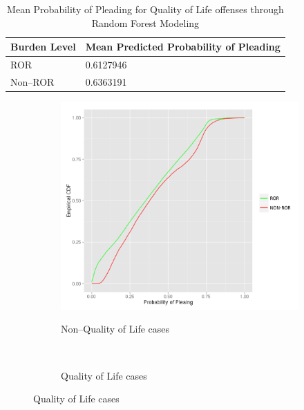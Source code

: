 \begin{table}
\centering
  \begin{tabular}{|p{}|p{}|}
    \hline
    \textbf{Burden Level} & \textbf{Mean Predicted Probability of Pleading} \\ \hline
    ROR & 0.6127946 \\ \hline
    Non--ROR & 0.6363191 \\ \hline
  \end{tabular}
  \caption{Mean Probability of Pleading for Quality of Life offenses through Random Forest Modeling}%
  \label{table:ROR_QoL_propensity_score}
\end{table}


\begin{figure}
  \centering
  \begin{subfigure}[b]{0.49\textwidth}
    \caption{Non--Quality of Life cases}
    \includegraphics[width=\textwidth]{figures/figxx.png}
    \label{fig:ROR_non--QoL_propensity_score}
  \end{subfigure}
  ~
  \begin{subfigure}[b]{0.49\textwidth}
    \caption{Quality of Life cases}

\end{subfigure}
\end{figure}
